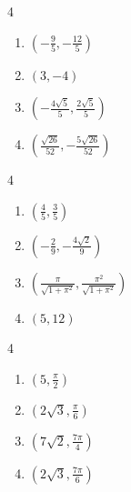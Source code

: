 \documentclass{ximera}
\begin{document}
\begin{multicols}{4} 

\begin{enumerate}

\setcounter{enumi}{\value{HW}}

\item $\left( -\frac{9}{5}, -\frac{12}{5} \right)$  
\item $\left( 3,-4 \right)$  
\item $\left( -\frac{4\sqrt{5}}{5}, \frac{2\sqrt{5}}{5} \right)$ 
\item $\left( \frac{\sqrt{26}}{52}, -\frac{5\sqrt{26}}{52} \right)$ 

\setcounter{HW}{\value{enumi}}

\end{enumerate}

\end{multicols}

\begin{multicols}{4} 

\begin{enumerate}

\setcounter{enumi}{\value{HW}}

\item $\left( \frac{4}{5}, \frac{3}{5} \right)$ 
\item $\left( -\frac{2}{9},  -\frac{4\sqrt{2}}{9} \right)$
\item $\left( \frac{\pi}{\sqrt{1+\pi^2}}, \frac{\pi^2}{\sqrt{1+\pi^2}} \right)$ 
\item $\left( 5, 12 \right)$ 

\setcounter{HW}{\value{enumi}}

\end{enumerate}

\end{multicols}

\begin{multicols}{4}

\begin{enumerate}

\setcounter{enumi}{\value{HW}}

\item $\left( 5, \frac{\pi}{2} \right)$ 
\item $\left( 2\sqrt{3}, \frac{\pi}{6} \right)$ 
\item $\left( 7\sqrt{2}, \frac{7\pi}{4} \right)$
\item $\left( 2\sqrt{3}, \frac{7\pi}{6} \right)$

\setcounter{HW}{\value{enumi}}

\end{enumerate}

\end{multicols}
\end{document}
